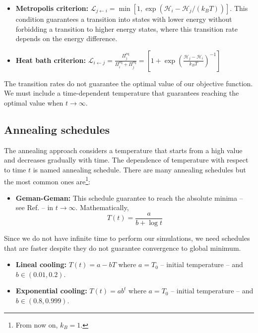 \begin{itemize}
    \item\textbf{Metropolis criterion:} $\mathcal{L}_{j \leftarrow i} = \min \left[1,\exp\left(\mathcal{H}_{i}-\mathcal{H}_{j}/\left(k_{B}T\right)\right)\right]$. This condition guarantees a transition into states with lower energy without forbidding a transition to higher energy states, where this transition rate depends on the energy difference. 
    \item \textbf{Heat bath criterion:} $\mathcal{L}_{i \leftarrow j} = \frac{\Pi_{j}^{\mathrm{eq}}}{\Pi_{i}^{\mathrm{eq}} + \Pi_{j}^{\mathrm{eq}}} = \left[1 + \exp\left(\frac{\mathcal{H}_{j}- \mathcal{H}_{i}}{k_{B}T}\right)^{-1}\right]$ 
\end{itemize}
 The transition rates do not guarantee the optimal value of our objective function. We must include a time-dependent temperature that guarantees reaching the optimal value when $t \rightarrow \infty$. 
\subsection{Annealing schedules}
The annealing approach considers a temperature that starts from a high value and decreases gradually with time. The dependence of temperature with respect to time $t$ is named annealing schedule. There are many annealing schedules but the most common ones are\footnote{From now on, $k_{B} = 1$.}:
\begin{itemize}
    \item \textbf{Geman-Geman:} This schedule guarantee to reach the absolute minima -- see Ref. \cite{Geman1984StochasticImages} -- in $t \rightarrow \infty$. Mathematically,
    \begin{equation}
        T(t) = \frac{a}{b + \log{t}}
    \end{equation}
\end{itemize}
Since we do not have infinite time to perform our simulations, we need schedules that are faster despite they do not guarantee convergence to global minimum. 
\begin{itemize}
    \item \textbf{Lineal cooling:} $T(t) = a - bT$ where $a = T_{0}$ -- initial temperature -- and $b \in (0.01,0.2)$.
    \item \textbf{Exponential cooling:} $T(t) = ab^{t}$ where $a = T_{0}$ -- initial temperature -- and $b \in (0.8,0.999)$.
\end{itemize}

